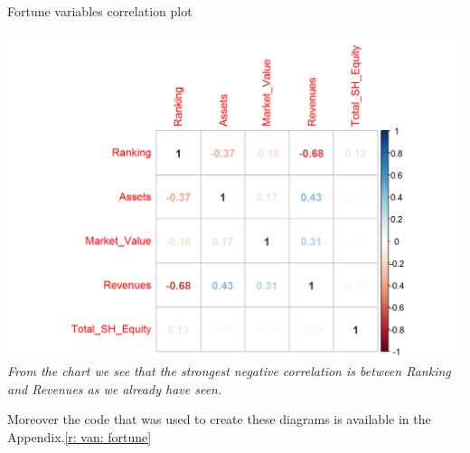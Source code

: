 \documentclass{article}
\begin{document}
\begin{table}[H]
\centering
\caption{Fortune variables correlation plot}
\begin{center}
\includegraphics[scale=0.5]{../R/photos/09_rank_corplot_f500.png}   \\
\textit{From the chart we see that the strongest negative correlation is between Ranking and Revenues as we already have seen.}
\end{center}
\end{table}

Moreover the code that was used to create these diagrams is available in the Appendix.\ref{r: van: fortune}
\end{document}
